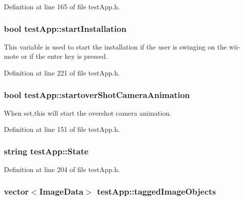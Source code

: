 Definition at line 165 of file test\-App.\-h.

\hypertarget{classtest_app_a8a65a6d1a473417cec1c2ac2e6116aae}{
\subsubsection[{start\-Installation}]{\setlength{\rightskip}{0pt plus 5cm}bool test\-App\-::start\-Installation}}\label{classtest_app_a8a65a6d1a473417cec1c2ac2e6116aae}


This variable is used to start the installation if the user is swinging on the wii-\/mote or if the enter key is pressed. 



Definition at line 221 of file test\-App.\-h.

\hypertarget{classtest_app_ad2fca6ce5e37462cd820afc48633324d}{
\subsubsection[{startover\-Shot\-Camera\-Animation}]{\setlength{\rightskip}{0pt plus 5cm}bool test\-App\-::startover\-Shot\-Camera\-Animation}}\label{classtest_app_ad2fca6ce5e37462cd820afc48633324d}


When set,this will start the overshot camera animation. 



Definition at line 151 of file test\-App.\-h.

\hypertarget{classtest_app_a8ce5505df4526abed238956b65956edd}{
\subsubsection[{State}]{\setlength{\rightskip}{0pt plus 5cm}string test\-App\-::\-State}}\label{classtest_app_a8ce5505df4526abed238956b65956edd}


Definition at line 204 of file test\-App.\-h.

\hypertarget{classtest_app_af65c8dc2f4620bfe7fdf6a39043cb48d}{
\subsubsection[{tagged\-Image\-Objects}]{\setlength{\rightskip}{0pt plus 5cm}vector$<${\bf Image\-Data}$>$ test\-App\-::tagged\-Image\-Objects}}\label{classtest_app_af65c8dc2f4620bfe7fdf6a39043cb48d}


